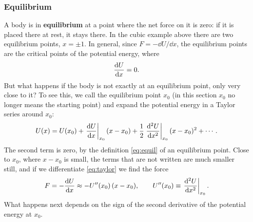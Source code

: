 \documentclass[11pt,a4paper]{article}
\newcommand{\at}[2]{\left.#1\right|_{#2}}
\begin{document}
\subsubsection{Equilibrium}\label{sec:equilibrium}

A body is in \textbf{equilibrium} at a point where the net force on it is zero: if it is placed there
at rest, it stays there. In the cubic example above there are two equilibrium points, $x = \pm 1$. In
general, since $F = -\dd U/\dd x$, the equilibrium points are the critical points of the potential
energy, where
\begin{equation}\label{eq:equil}
  \frac{\mathrm{d} U}{\mathrm{d} x} = 0 .
\end{equation}
But what happens if the body is not exactly at an equilibrium point, only very close to it? To see
this, we call the equilibrium point $x_0$ (in this section $x_0$ no longer means the starting
point) and expand the potential energy in a Taylor series around $x_0$:
\begin{equation}\label{eq:taylor}
  U(x) = U(x_0) + \at{\dv{U}{x}}{x_0}(x - x_0) + \frac12\at{\frac{\dd^2 U}{\dd x^2}}{x_0}(x - x_0)^2
  + \cdots .
\end{equation}
The second term is zero, by the definition \eqref{eq:equil} of an equilibrium point. Close to $x_0$,
where $x - x_0$ is small, the terms that are not written are much smaller still, and if we
differentiate \eqref{eq:taylor} we find the force
\[
  F = -\dv{U}{x} \approx -U''(x_0)\,(x - x_0) , \qquad U''(x_0) \equiv \at{\frac{\dd^2 U}{\dd x^2}}{x_0} .
\]
What happens next depends on the sign of the second derivative of the potential energy at $x_0$.
\end{document}
